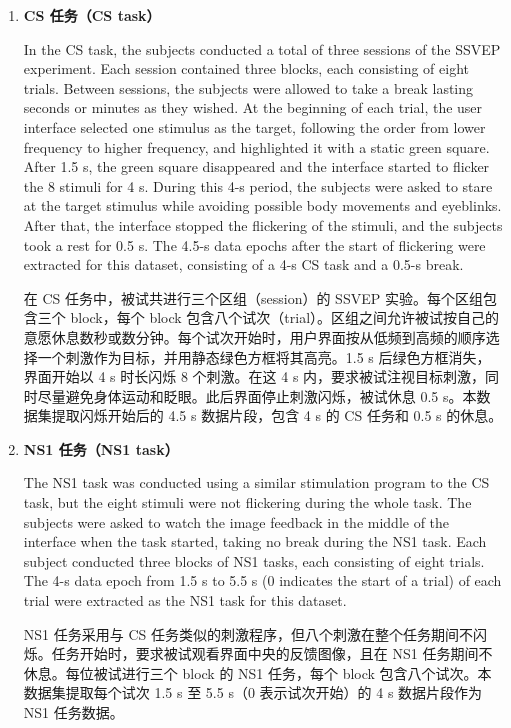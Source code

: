 \documentclass[11pt]{ctexart}
\newenvironment{en}{\begin{enbox}\color{black!85}}{\end{enbox}}
\newenvironment{zh}{\begin{zhbox}}{\end{zhbox}}
\begin{document}
\begin{enumerate}[label=\textbf{\arabic*.}]
\item \textbf{CS 任务（CS task）}
\begin{en}
In the CS task, the subjects conducted a total of three sessions of the SSVEP experiment. Each session contained three blocks, each consisting of eight trials. Between sessions, the subjects were allowed to take a break lasting seconds or minutes as they wished. At the beginning of each trial, the user interface selected one stimulus as the target, following the order from lower frequency to higher frequency, and highlighted it with a static green square. After 1.5 s, the green square disappeared and the interface started to flicker the 8 stimuli for 4 s. During this 4-s period, the subjects were asked to stare at the target stimulus while avoiding possible body movements and eyeblinks. After that, the interface stopped the flickering of the stimuli, and the subjects took a rest for 0.5 s. The 4.5-s data epochs after the start of flickering were extracted for this dataset, consisting of a 4-s CS task and a 0.5-s break.
\end{en}
\begin{zh}
在 CS 任务中，被试共进行三个区组（session）的 SSVEP 实验。每个区组包含三个 block，每个 block 包含八个试次（trial）。区组之间允许被试按自己的意愿休息数秒或数分钟。每个试次开始时，用户界面按从低频到高频的顺序选择一个刺激作为目标，并用静态绿色方框将其高亮。1.5 s 后绿色方框消失，界面开始以 4 s 时长闪烁 8 个刺激。在这 4 s 内，要求被试注视目标刺激，同时尽量避免身体运动和眨眼。此后界面停止刺激闪烁，被试休息 0.5 s。本数据集提取闪烁开始后的 4.5 s 数据片段，包含 4 s 的 CS 任务和 0.5 s 的休息。
\end{zh}

\item \textbf{NS1 任务（NS1 task）}
\begin{en}
The NS1 task was conducted using a similar stimulation program to the CS task, but the eight stimuli were not flickering during the whole task. The subjects were asked to watch the image feedback in the middle of the interface when the task started, taking no break during the NS1 task. Each subject conducted three blocks of NS1 tasks, each consisting of eight trials. The 4-s data epoch from 1.5 s to 5.5 s (0 indicates the start of a trial) of each trial were extracted as the NS1 task for this dataset.
\end{en}
\begin{zh}
NS1 任务采用与 CS 任务类似的刺激程序，但八个刺激在整个任务期间不闪烁。任务开始时，要求被试观看界面中央的反馈图像，且在 NS1 任务期间不休息。每位被试进行三个 block 的 NS1 任务，每个 block 包含八个试次。本数据集提取每个试次 1.5 s 至 5.5 s（0 表示试次开始）的 4 s 数据片段作为 NS1 任务数据。
\end{zh}


\end{enumerate}
\end{document}
